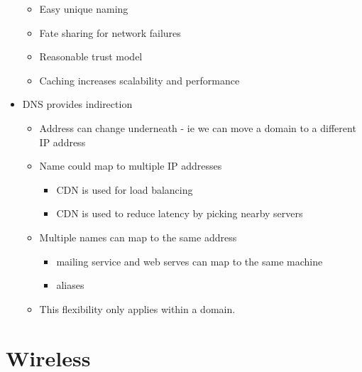 \documentclass[]{article}
\providecommand{\tightlist}{%
  \setlength{\itemsep}{0pt}\setlength{\parskip}{0pt}}
\begin{document}
\begin{itemize}
  \begin{itemize}
  \tightlist
  \item
    Easy unique naming
  \item
    Fate sharing for network failures
  \item
    Reasonable trust model
  \item
    Caching increases scalability and performance
  \end{itemize}
\item
  DNS provides indirection

  \begin{itemize}
  \tightlist
  \item
    Address can change underneath - ie we can move a domain to a
    different IP address
  \item
    Name could map to multiple IP addresses

    \begin{itemize}
    \tightlist
    \item
      CDN is used for load balancing
    \item
      CDN is used to reduce latency by picking nearby servers
    \end{itemize}
  \item
    Multiple names can map to the same address

    \begin{itemize}
    \tightlist
    \item
      mailing service and web serves can map to the same machine
    \item
      aliases
    \end{itemize}
  \item
    This flexibility only applies within a domain.
  \end{itemize}
\end{itemize}

\hypertarget{wireless}{%
\section{Wireless}\label{wireless}}
\end{document}
